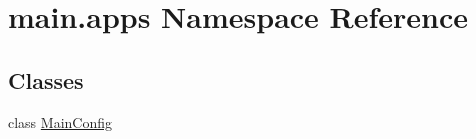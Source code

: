 \hypertarget{namespacemain_1_1apps}{}\section{main.\+apps Namespace Reference}
\label{namespacemain_1_1apps}
\subsection*{Classes}
\begin{DoxyCompactItemize}
\item 
class \hyperlink{classmain_1_1apps_1_1MainConfig}{Main\+Config}
\end{DoxyCompactItemize}
